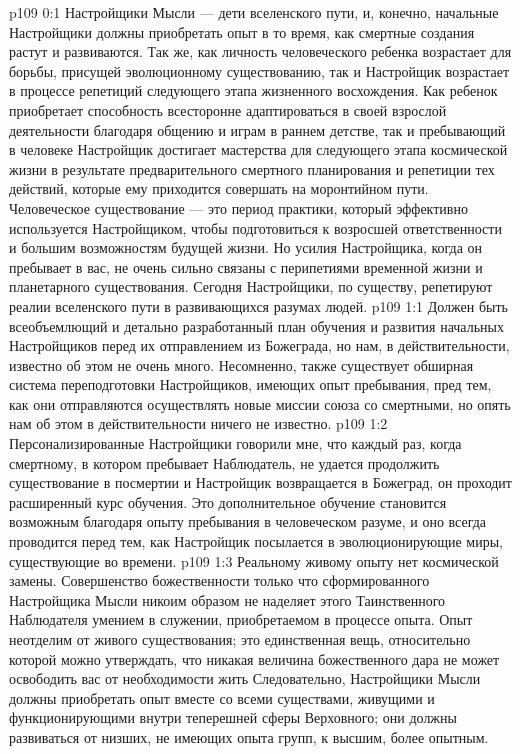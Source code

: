 \author{Одиночный Вестник}
\vs p109 0:1 Настройщики Мысли --- дети вселенского пути, и, конечно, начальные Настройщики должны приобретать опыт в то время, как смертные создания растут и развиваются. Так же, как личность человеческого ребенка возрастает для борьбы, присущей эволюционному существованию, так и Настройщик возрастает в процессе репетиций следующего этапа жизненного восхождения. Как ребенок приобретает способность всесторонне адаптироваться в своей взрослой деятельности благодаря общению и играм в раннем детстве, так и пребывающий в человеке Настройщик достигает мастерства для следующего этапа космической жизни в результате предварительного смертного планирования и репетиции тех действий, которые ему приходится совершать на моронтийном пути. Человеческое существование --- это период практики, который эффективно используется Настройщиком, чтобы подготовиться к возросшей ответственности и большим возможностям будущей жизни. Но усилия Настройщика, когда он пребывает в вас, не очень сильно связаны с перипетиями временной жизни и планетарного существования. Сегодня Настройщики, по существу, репетируют реалии вселенского пути в развивающихся разумах людей.
\vs p109 1:1 Должен быть всеобъемлющий и детально разработанный план обучения и развития начальных Настройщиков перед их отправлением из Божеграда, но нам, в действительности, известно об этом не очень много. Несомненно, также существует обширная система переподготовки Настройщиков, имеющих опыт пребывания, пред тем, как они отправляются осуществлять новые миссии союза со смертными, но опять нам об этом в действительности ничего не известно.
\vs p109 1:2 Персонализированные Настройщики говорили мне, что каждый раз, когда смертному, в котором пребывает Наблюдатель, не удается продолжить существование в посмертии и Настройщик возвращается в Божеград, он проходит расширенный курс обучения. Это дополнительное обучение становится возможным благодаря опыту пребывания в человеческом разуме, и оно всегда проводится перед тем, как Настройщик посылается в эволюционирующие миры, существующие во времени.
\vs p109 1:3 Реальному живому опыту нет космической замены. Совершенство божественности только что сформированного Настройщика Мысли никоим образом не наделяет этого Таинственного Наблюдателя умением в служении, приобретаемом в процессе опыта. Опыт неотделим от живого существования; это единственная вещь, относительно которой можно утверждать, что никакая величина божественного дара не может освободить вас от необходимости жить  Следовательно, Настройщики Мысли должны приобретать опыт вместе со всеми существами, живущими и функционирующими внутри теперешней сферы Верховного; они должны развиваться от низших, не имеющих опыта групп, к высшим, более опытным.
